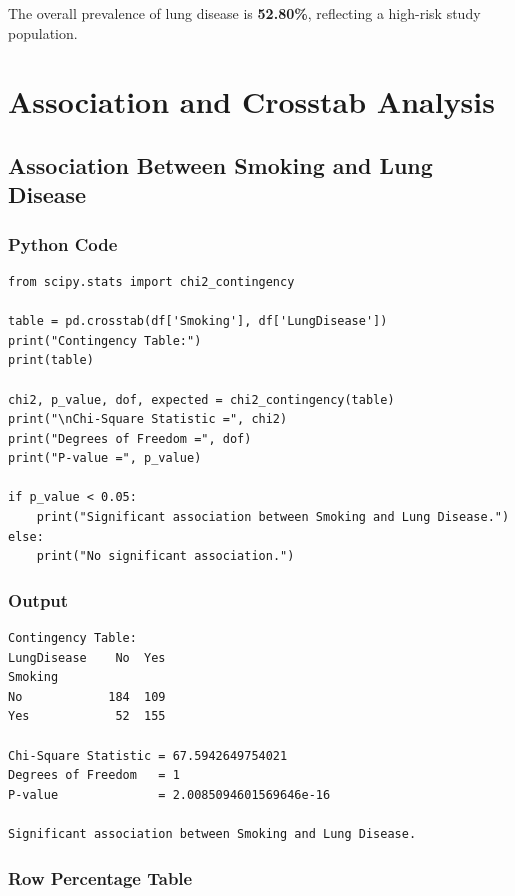 \documentclass[12pt,a4paper]{article}
\begin{document}
The overall prevalence of lung disease is \textbf{52.80\%}, reflecting a high-risk study population.

\section{Association and Crosstab Analysis}

\subsection{Association Between Smoking and Lung Disease}

\subsubsection{Python Code}

\begin{lstlisting}[style=pythonstyle, caption={Chi-square test}]
from scipy.stats import chi2_contingency

table = pd.crosstab(df['Smoking'], df['LungDisease'])
print("Contingency Table:")
print(table)

chi2, p_value, dof, expected = chi2_contingency(table)
print("\nChi-Square Statistic =", chi2)
print("Degrees of Freedom =", dof)
print("P-value =", p_value)

if p_value < 0.05:
    print("Significant association between Smoking and Lung Disease.")
else:
    print("No significant association.")
\end{lstlisting}

\subsubsection{Output}

\begin{lstlisting}[style=outputstyle]
Contingency Table:
LungDisease    No  Yes
Smoking
No            184  109
Yes            52  155

Chi-Square Statistic = 67.5942649754021
Degrees of Freedom   = 1
P-value              = 2.0085094601569646e-16

Significant association between Smoking and Lung Disease.
\end{lstlisting}

\subsubsection{Row Percentage Table}
\end{document}
